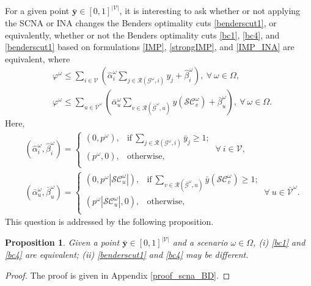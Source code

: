 \documentclass[a4paper,10pt]{article}
\theoremstyle{plain}
\newtheorem{proposition}[theorem]{Proposition}
\newcommand{\revv}[1]{{#1}}
\begin{document}
{	
	
	For a given point $\bar{\boldsymbol{y}} \in {[0,1]}^{|\mathcal{V}|}$, it is interesting to ask whether or not applying the SCNA or INA changes the Benders optimality cuts \eqref{benderscut1}, or equivalently, whether or not the Benders optimality cuts \revv{\eqref{bc1}, \eqref{bc4}, and \eqref{benderscut1}} based on formulations \eqref{IMP}, \eqref{strongIMP}, and \eqref{IMP_INA} are equivalent\revv{, where}
	\revv{
		\begin{align}
			& \varphi^{\omega}\leq\sum_{i\in\mathcal{V}}\left(\hat{\alpha}_i^{\omega}\sum_{j\in\mathcal{R}(\mathcal{G}^{\omega},i)}y_j+\hat{\beta}_i^{\omega}\right),~\forall~\omega \in \Omega,\label{bc1}\\
			& \varphi^{\omega}\leq\sum_{u\in\bar{\mathcal{V}}^{\omega}}\left(\bar{\alpha}_u^{\omega}\sum_{v\in\mathcal{R}(\bar{\mathcal{G}}^{\omega},u)}y(\mathcal{SC}_v^{\omega})+\bar{\beta}_u^{\omega}\right),~\forall~\omega \in \Omega.	\label{bc4}
		\end{align}
	}%
	\revv{Here,
		\begin{align}\label{ab1}
			& (\hat{\alpha}_i^{\omega},\hat{\beta}_i^{\omega})=\left\{
			\begin{array}{ll}
				(0,p^\omega),& {\text{if}}~\sum_{j\in\mathcal{R}(\mathcal{G}^{\omega},i)}\bar{y}_j\geq 1;\\[3pt]
				(p^\omega,0),& \text{otherwise},\\
			\end{array}\right. ~  \forall ~i \in {\mathcal{V}},\\
			&(\bar{\alpha}_u^{\omega},\bar{\beta}_u^{\omega})=\left\{
			\begin{array}{ll}
				(0,p^\omega|\mathcal{SC}_u^{\omega}|),& {\text{if}}~\sum_{v\in\mathcal{R}(\bar{\mathcal{G}}^{\omega},u)}\bar{y}(\mathcal{SC}_v^{\omega})\geq 1;\\[3pt]
				(p^\omega|\mathcal{SC}_u^{\omega}|,0),& \text{otherwise},\\
			\end{array}\right. ~  \forall ~u \in \bar{\mathcal{V}}^{\omega}.\label{ab2}
		\end{align}
	}%
	This question is addressed by the following proposition.
	\begin{proposition}\label{bcnotchanged}
		\revv{Given a point $\bar{\boldsymbol{y}} \in {[0,1]}^{|\mathcal{V}|}$ and a scenario $\omega \in \Omega$, (i) \eqref{bc1} and \eqref{bc4} are equivalent; (ii) \eqref{benderscut1} and \eqref{bc4} may be different.}
	\end{proposition}
	\begin{proof}
		The proof \revv{is given in} Appendix \ref{proof_scna_BD}.
	\end{proof}
	
}
\end{document}
